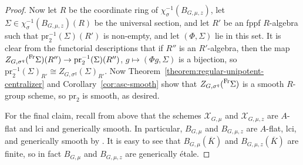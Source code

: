 \documentclass[11pt,reqno]{amsart}
\theoremstyle{definition}
\newcommand{\sX}{{\mathscr X}}
\newcommand{\ov}[1]{\overline{#1}}
\begin{document}
\begin{proof}
    Now let $R$ be the coordinate ring of $\chi_\sigma^{-1}(B_{G,\mu,z})$, let $\Sigma \in \chi_\sigma^{-1}(B_{G,\mu,z})(R)$ be the universal section, and let $R'$ be an fppf $R$-algebra such that $\mathrm{pr}_2^{-1}(\Sigma)(R')$ is non-empty, and let $(\Phi, \Sigma)$ lie in this set. It is clear from the functorial descriptions that if $R''$ is an $R'$-algebra, then the map $Z_{G, \sigma^q}(\prescript{\mathrm{Fr}}{}{\Sigma})(R'') \to \mathrm{pr}_2^{-1}(\Sigma)(R'')$, $g \mapsto (\Phi g, \Sigma)$ is a bijection, so $\mathrm{pr}_2^{-1}(\Sigma)_{R'} \cong Z_{G, \sigma^q}(\Sigma)_{R'}$. Now Theorem~\ref{theorem:regular-unipotent-centralizer} and Corollary~\ref{cor:asc-smooth} show that $Z_{G, \sigma^q}(\prescript{\mathrm{Fr}}{}{\Sigma})$ is a smooth $R$-group scheme, so $\mathrm{pr}_2$ is smooth, as desired.
    
    For the final claim, recall from above that the schemes $\sX_{G, \mu}$ and $\sX_{G, \mu, z}$ are $A$-flat and lci and generically smooth. In particular, $B_{G,\mu}$ and $B_{G,\mu,z}$ are $A$-flat, lci, and generically smooth by \cite[Theorem 23.7]{Matsumura}. It is easy to see that $B_{G,\mu}(\ov{K})$ and $B_{G,\mu,z}(\ov{K})$ are finite, so in fact $B_{G,\mu}$ and $B_{G,\mu,z}$ are generically \'etale.
\end{proof}
\end{document}
